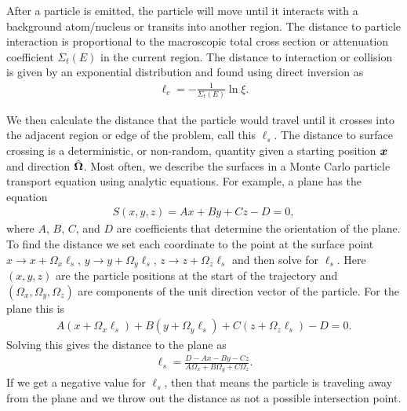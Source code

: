 After a particle is emitted, the particle will move until it interacts with a background atom/nucleus or transits into another region. The distance to particle interaction is proportional to the macroscopic total cross section or attenuation coefficient $\Sigma_t(E)$ in the current region. The distance to interaction or collision is given by an exponential distribution and found using direct inversion as
\begin{align}
  \ell_c = -\frac{1}{\Sigma_t(E)} \ln \xi .
\end{align}

We then calculate the distance that the particle would travel until it crosses into the adjacent region or edge of the problem, call this $\ell_s$. The distance to surface crossing is a deterministic, or non-random, quantity given a starting position $\bm{x}$ and direction $\hat{\mathbf{\Omega}}$. Most often, we describe the surfaces in a Monte Carlo particle transport equation using analytic equations. For example, a plane has the equation
\begin{align}
  S(x,y,z) = A x + B y + C z - D = 0,
\end{align}
where $A$, $B$, $C$, and $D$ are coefficients that determine the orientation of the plane. To find the distance we set each coordinate to the point at the surface point $x \rightarrow x + \Omega_x \ell_s$, $y \rightarrow y + \Omega_y \ell_s$, $z \rightarrow z + \Omega_z \ell_s$ and then solve for $\ell_s$. Here $(x,y,z)$ are the particle positions at the start of the trajectory and $(\Omega_x,\Omega_y,\Omega_z)$ are components of the unit direction vector of the particle. For the plane this is
\begin{align}
  A ( x + \Omega_x \ell_s ) + B ( y + \Omega_y \ell_s ) + C ( z + \Omega_z \ell_s ) - D = 0.
\end{align}
Solving this gives the distance to the plane as
\begin{align}
  \ell_s = \frac{ D - A x - B y - C z }{ A \Omega_x + B \Omega_y + C \Omega_z } .
\end{align}
If we get a negative value for $\ell_s$, then that means the particle is traveling away from the plane and we throw out the distance as not a possible intersection point.

